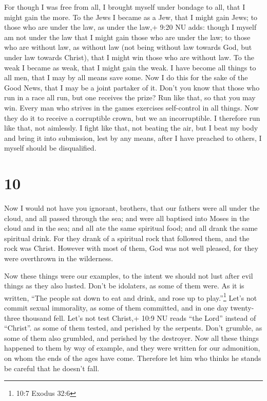  For though I was free from all, I brought myself under
bondage to all, that I might gain the more.  To the Jews I
became as a Jew, that I might gain Jews; to those who are under the law,
as under the law,+ 9:20 NU adds: though I myself am not under the law
that I might gain those who are under the law;  to those
who are without law, as without law (not being without law towards God,
but under law towards Christ), that I might win those who are without
law.  To the weak I became as weak, that I might gain the
weak. I have become all things to all men, that I may by all means save
some.  Now I do this for the sake of the Good News, that I
may be a joint partaker of it.  Don't you know that those
who run in a race all run, but one receives the prize? Run like that, so
that you may win.  Every man who strives in the games
exercises self-control in all things. Now they do it to receive a
corruptible crown, but we an incorruptible.  I therefore
run like that, not aimlessly. I fight like that, not beating the air,
 but I beat my body and bring it into submission, lest by
any means, after I have preached to others, I myself should be
disqualified.

\hypertarget{section-9}{%
\section{10}\label{section-9}}

 Now I would not have you ignorant, brothers, that our
fathers were all under the cloud, and all passed through the sea;
 and were all baptised into Moses in the cloud and in the
sea;  and all ate the same spiritual food;  and
all drank the same spiritual drink. For they drank of a spiritual rock
that followed them, and the rock was Christ.  However with
most of them, God was not well pleased, for they were overthrown in the
wilderness.

 Now these things were our examples, to the intent we should
not lust after evil things as they also lusted.  Don't be
idolaters, as some of them were. As it is written, ``The people sat down
to eat and drink, and rose up to play.''\footnote{10:7 Exodus 32:6}
 Let's not commit sexual immorality, as some of them
committed, and in one day twenty-three thousand fell.  Let's
not test Christ,+ 10:9 NU reads ``the Lord'' instead of ``Christ''. as
some of them tested, and perished by the serpents.  Don't
grumble, as some of them also grumbled, and perished by the destroyer.
 Now all these things happened to them by way of example,
and they were written for our admonition, on whom the ends of the ages
have come.  Therefore let him who thinks he stands be
careful that he doesn't fall.

